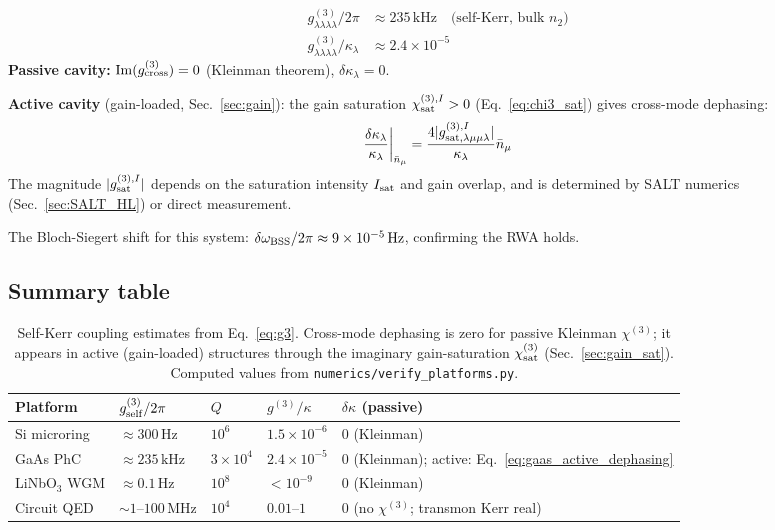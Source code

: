 \documentclass[12pt]{article}
\newcommand{\BSS}{{\rm BSS}}
\begin{document}
\begin{align}
  g^{(3)}_{\lambda\lambda\lambda\lambda}/2\pi
  &\approx 235\,\mathrm{kHz}
  \quad\text{(self-Kerr, bulk $n_2$)}
  \label{eq:gaas_self}\\
  g^{(3)}_{\lambda\lambda\lambda\lambda}/\kappa_\lambda
  &\approx 2.4\times10^{-5}
  \label{eq:gaas_per_photon}
\end{align}
\textbf{Passive cavity:}
$\mathrm{Im}(g^{(3)}_{\rm cross}) = 0$ (Kleinman theorem),
$\delta\kappa_\lambda = 0$.

\textbf{Active cavity} (gain-loaded, Sec.~\ref{sec:gain}): the gain saturation
$\chi^{(3),I}_{\rm sat}>0$ (Eq.~\ref{eq:chi3_sat}) gives
cross-mode dephasing:
\begin{equation}
  \frac{\delta\kappa_\lambda}{\kappa_\lambda}\bigg|_{\bar{n}_\mu}
  = \frac{4|g^{(3),I}_{\rm sat,\lambda\mu\mu\lambda}|}{\kappa_\lambda}
  \bar{n}_\mu
  \label{eq:gaas_active_dephasing}
\end{equation}
The magnitude $|g^{(3),I}_{\rm sat}|$ depends on the saturation intensity
$I_{\rm sat}$ and gain overlap, and is determined by SALT numerics
(Sec.~\ref{sec:SALT_HL}) or direct measurement.

The Bloch-Siegert shift for this system: $\delta\omega_\BSS/2\pi
\approx 9\times10^{-5}\,\mathrm{Hz}$, confirming the RWA holds.

\subsection{Summary table}

\begin{table}[h]
\centering
\begin{tabular}{lllll}
\hline
Platform & $g^{(3)}_{\rm self}/2\pi$ & $Q$ & $g^{(3)}/\kappa$ &
$\delta\kappa$ (passive)\\
\hline
Si microring & $\approx 300\,\mathrm{Hz}$ & $10^6$ &
$1.5\times10^{-6}$ & 0 (Kleinman)\\
GaAs PhC & $\approx 235\,\mathrm{kHz}$ & $3\times10^4$ &
$2.4\times10^{-5}$ & 0 (Kleinman); active: Eq.~\eqref{eq:gaas_active_dephasing}\\
LiNbO$_3$ WGM & $\approx 0.1\,\mathrm{Hz}$ & $10^8$ &
$<10^{-9}$ & 0 (Kleinman)\\
Circuit QED & $\sim 1\text{--}100\,\mathrm{MHz}$ & $10^4$ &
$0.01\text{--}1$ & 0 (no $\chi^{(3)}$; transmon Kerr real)\\
\hline
\end{tabular}
\caption{Self-Kerr coupling estimates from Eq.~\eqref{eq:g3}.
Cross-mode dephasing is zero for passive Kleinman $\chi^{(3)}$; it
appears in active (gain-loaded) structures through the imaginary
gain-saturation $\chi^{(3)}_{\rm sat}$ (Sec.~\ref{sec:gain_sat}).
Computed values from
\texttt{numerics/verify\_platforms.py}.}
\label{tab:numerics}
\end{table}
\end{document}
